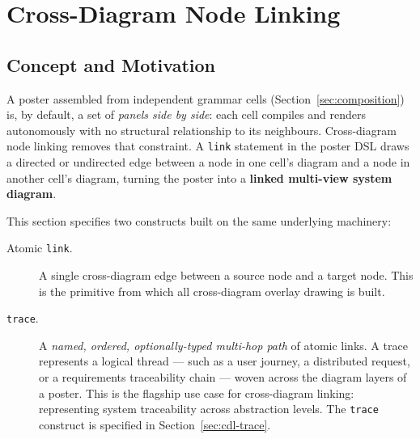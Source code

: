 %

\section{Cross-Diagram Node Linking}
\label{sec:cross-diagram-links}

\subsection{Concept and Motivation}

A poster assembled from independent grammar cells
(Section~\ref{sec:composition}) is, by default, a set of \emph{panels side by
side}: each cell compiles and renders autonomously with no structural
relationship to its neighbours.  Cross-diagram node linking removes that
constraint.  A \texttt{link} statement in the poster DSL draws a directed or
undirected edge between a node in one cell's diagram and a node in another
cell's diagram, turning the poster into a \textbf{linked multi-view system
diagram}.

This section specifies two constructs built on the same underlying machinery:

\begin{description}
  \item[Atomic \texttt{link}.] A single cross-diagram edge between a source
        node and a target node.  This is the primitive from which all
        cross-diagram overlay drawing is built.

  \item[\texttt{trace}.] A \emph{named, ordered, optionally-typed multi-hop
        path} of atomic links.  A trace represents a logical thread --- such
        as a user journey, a distributed request, or a requirements
        traceability chain --- woven across the diagram layers of a poster.
        This is the flagship use case for cross-diagram linking: representing
        system traceability across abstraction levels.  The \texttt{trace}
        construct is specified in Section~\ref{sec:cdl-trace}.
\end{description}

